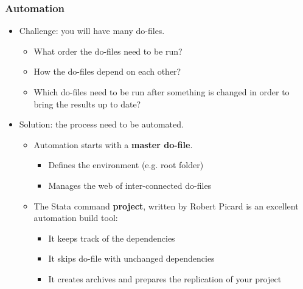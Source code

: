 \documentclass{beamer}
\begin{document}
{
	\frametitle{Automation}
	
	\begin{itemize}
		\item Challenge: you will have many do-files.
		\begin{itemize}
			\item What order the do-files need to be run?
			\item How the do-files depend on each other?
			\item Which do-files need to be run after something is changed in order to bring the results up to date?
		\end{itemize}
		\item Solution: the process need to be automated.
		\begin{itemize}
			\item Automation starts with a \textbf{master do-file}. 
			\begin{itemize}
				\item Defines the environment (e.g. root folder)
				\item Manages the web of inter-connected do-files
			\end{itemize}
			\item The Stata command \textbf{project}, written by Robert Picard is an excellent automation build tool:
			\begin{itemize}
				\item It keeps track of the dependencies
				\item It skips do-file with unchanged dependencies
				\item It creates archives and prepares the replication of your project
			\end{itemize}
		\end{itemize}
	\end{itemize}	
	
}
\end{document}
